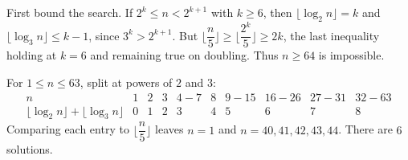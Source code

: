 First bound the search. If $2^k\le n<2^{k+1}$ with $k\ge6$, then $\lfloor\log_2n\rfloor=k$ and $\lfloor\log_3n\rfloor\le k-1$, since $3^k>2^{k+1}$. But $\lfloor\dfrac{n}{5}\rfloor\ge\lfloor\dfrac{2^k}{5}\rfloor\ge2k$, the last inequality holding at $k=6$ and remaining true on doubling. Thus $n\ge64$ is impossible.

For $1\le n\le63$, split at powers of $2$ and $3$:
\[
\begin{array}{c|rrrrrrrrr}
n&1&2&3&4\!-\!7&8&9\!-\!15&16\!-\!26&27\!-\!31&32\!-\!63\\ \hline
\lfloor\log_2n\rfloor+\lfloor\log_3n\rfloor
&0&1&2&3&4&5&6&7&8
\end{array}
\]
Comparing each entry to $\lfloor\dfrac{n}{5}\rfloor$ leaves $n=1$ and $n=40,41,42,43,44$. There are $\boxed6$ solutions.
